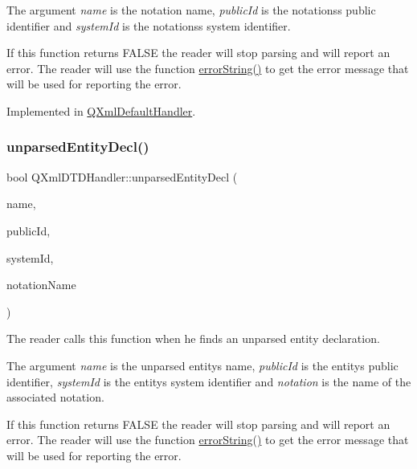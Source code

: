 The argument {\itshape name} is the notation name, {\itshape public\+Id} is the notations\textquotesingle{}s public identifier and {\itshape system\+Id} is the notations\textquotesingle{}s system identifier.

If this function returns F\+A\+L\+SE the reader will stop parsing and will report an error. The reader will use the function \mbox{\hyperlink{class_q_xml_d_t_d_handler_a40f40b9674be96a009a93147d5e0178d}{error\+String()}} to get the error message that will be used for reporting the error. 

Implemented in \mbox{\hyperlink{class_q_xml_default_handler_aaa24e258c75cd45e2bd560864b418958}{Q\+Xml\+Default\+Handler}}.

\mbox{\label{class_q_xml_d_t_d_handler_a956c5143b8f349a19782fb56c577e04e}} 
\subsubsection{\texorpdfstring{unparsedEntityDecl()}{unparsedEntityDecl()}}
{\footnotesize\ttfamily bool Q\+Xml\+D\+T\+D\+Handler\+::unparsed\+Entity\+Decl (\begin{DoxyParamCaption}\item[{const \mbox{\hyperlink{class_q_string}{Q\+String}} \&}]{name,  }\item[{const \mbox{\hyperlink{class_q_string}{Q\+String}} \&}]{public\+Id,  }\item[{const \mbox{\hyperlink{class_q_string}{Q\+String}} \&}]{system\+Id,  }\item[{const \mbox{\hyperlink{class_q_string}{Q\+String}} \&}]{notation\+Name }\end{DoxyParamCaption})\hspace{0.3cm}{\ttfamily [pure virtual]}}

The reader calls this function when he finds an unparsed entity declaration.

The argument {\itshape name} is the unparsed entity\textquotesingle{}s name, {\itshape public\+Id} is the entity\textquotesingle{}s public identifier, {\itshape system\+Id} is the entity\textquotesingle{}s system identifier and {\itshape notation} is the name of the associated notation.

If this function returns F\+A\+L\+SE the reader will stop parsing and will report an error. The reader will use the function \mbox{\hyperlink{class_q_xml_d_t_d_handler_a40f40b9674be96a009a93147d5e0178d}{error\+String()}} to get the error message that will be used for reporting the error. 

